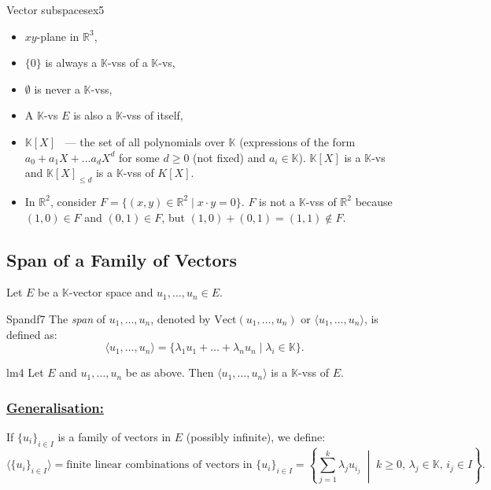 \documentclass[11pt, a4paper]{article}
\newcommand{\R}{\mathbb{R}}
\newcommand{\K}{\mathbb{K}}
\begin{document}
\begin{example}{Vector subspaces}{ex5}
  \begin{itemize}
    \item $xy$-plane in $\R^3$,
    \item $\{0\}$ is always a $\K$-vss of a $\K$-vs,
    \item $\emptyset$ is never a $\K$-vss,
    \item A $\K$-vs $E$ is also a $\K$-vss of itself,
    \item $\K[X]$ ~--- the set of all polynomials over $\K$ (expressions of the form $a_0 + a_1 X + \dots a_d X^d$ for some $d \geq 0$ (not fixed) and $a_i \in \K$).
    $\K[X]$ is a $\K$-vs and $\K[X]_{\leq d}$ is a $\K$-vss of $K[X]$.
    \item In $\R^2$, consider $F = \{(x, y) \in \R^2 \mid x \cdot y = 0\}$. 
    $F$ is not a $\K$-vss of $\R^2$ because $(1,0) \in F$ and $(0,1) \in F$, but $(1,0) + (0,1) = (1,1) \notin F$.
    
  \end{itemize}
\end{example}

\subsection{Span of a Family of Vectors}

Let $E$ be a $\K$-vector space and $u_1, \dots, u_n \in E$.

\begin{definition}{Span}{df7}
  The \emph{span} of $u_1, \dots, u_n$, denoted by $\text{Vect}(u_1, \dots, u_n)$ or $\langle u_1, \dots, u_n \rangle$, is defined as:
  \[
    \langle u_1, \dots, u_n \rangle = \{ \lambda_1 u_1 + \dots + \lambda_n u_n \mid \lambda_i \in \K \}.
  \]
\end{definition}

\begin{lemma}{}{lm4}
  Let $E$ and $u_1, \dots, u_n$ be as above. Then $\langle u_1, \dots, u_n \rangle$ is a $\K$-vss of $E$.
\end{lemma}

\subsubsection*{\underline{Generalisation:}}
If $\{u_i\}_{i \in I}$ is a family of vectors in $E$ (possibly infinite), we define:
\[
  \langle \{u_i\}_{i \in I} \rangle = \text{finite linear combinations of vectors in } \{u_i\}_{i \in I} = \left\{ \sum_{j=1}^k \lambda_j u_{i_j} \;\middle|\; k \ge 0, \, \lambda_j \in \K, \, i_j \in I \right\}.
\]
\end{document}
